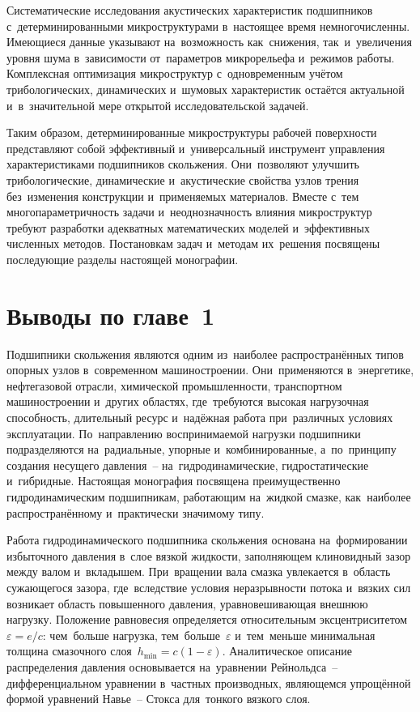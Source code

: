 Систематические исследования акустических характеристик подшипников с~детерминированными микроструктурами в~настоящее время немногочисленны. Имеющиеся данные указывают на~возможность как~снижения, так~и~увеличения уровня шума в~зависимости от~параметров микрорельефа и~режимов работы. Комплексная оптимизация микроструктур с~одновременным учётом трибологических, динамических и~шумовых характеристик остаётся актуальной и~в~значительной мере открытой исследовательской задачей.

Таким образом, детерминированные микроструктуры рабочей поверхности представляют собой эффективный и~универсальный инструмент управления характеристиками подшипников скольжения. Они~позволяют улучшить трибологические, динамические и~акустические свойства узлов трения без~изменения конструкции и~применяемых материалов. Вместе с~тем многопараметричность задачи и~неоднозначность влияния микроструктур требуют разработки адекватных математических моделей и~эффективных численных методов. Постановкам задач и~методам их~решения посвящены последующие разделы настоящей монографии.

\FloatBarrier
\section*{Выводы по главе~1}

Подшипники скольжения являются одним из~наиболее
распространённых типов опорных узлов в~современном
машиностроении. Они~применяются в~энергетике, нефтегазовой
отрасли, химической промышленности, транспортном
машиностроении и~других областях, где~требуются высокая
нагрузочная способность, длительный ресурс и~надёжная работа
при~различных условиях эксплуатации. По~направлению
воспринимаемой нагрузки подшипники подразделяются
на~радиальные, упорные и~комбинированные, а~по~принципу
создания несущего давления~-- на~гидродинамические,
гидростатические и~гибридные. Настоящая монография посвящена
преимущественно гидродинамическим подшипникам, работающим
на~жидкой смазке, как~наиболее распространённому
и~практически значимому типу.

Работа гидродинамического подшипника скольжения основана
на~формировании избыточного давления в~слое вязкой жидкости,
заполняющем клиновидный зазор между валом и~вкладышем.
При~вращении вала смазка увлекается в~область сужающегося
зазора, где~вследствие условия неразрывности потока и~вязких
сил возникает область повышенного давления, уравновешивающая
внешнюю нагрузку. Положение равновесия определяется
относительным эксцентриситетом~$\varepsilon = e/c$:
чем~больше нагрузка, тем~больше~$\varepsilon$ и~тем~меньше
минимальная толщина смазочного
слоя~$h_{\min} = c(1 - \varepsilon)$. Аналитическое описание
распределения давления основывается на~уравнении Рейнольдса~--
дифференциальном уравнении в~частных производных, являющемся
упрощённой формой уравнений Навье~-- Стокса для~тонкого
вязкого слоя.

